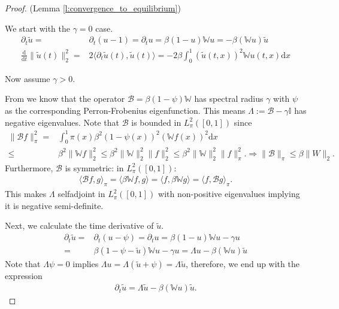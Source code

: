 \documentclass{article}
\renewcommand{\d}{\mathrm{d}}
\newcommand{\W}{\mathbb{W}}
\newcommand{\1}[1]{{\mathds{1}}_{\left\{#1\right\}}}
\begin{document}
\begin{proof}(Lemma \ref{l:convergence_to_equilibrium})
	
	We start with the $\gamma=0$ case.
	\begin{align*}
	\partial_t \tilde{u}=&\partial_t (u-1)=\partial_t u=\beta(1-u)\W u=-\beta \left(\W u \right) \tilde{u} \\
	\frac{\d}{\d t} \|\tilde{u}(t) \|_2^2=& 2 \langle \partial_t \tilde{u}(t), \tilde{u}(t) \rangle=-2\beta \int_{0}^{1}  \left( \tilde{u}(t,x) \right)^2 \W u(t,x) \d x 
	\end{align*}
	
	Now assume $\gamma>0$.
	
	From \cite[Proposition 4.13.]{SISdyn} we know that the operator $\mathcal{B}=\beta(1-\psi)\W$ has spectral radius $\gamma$ with $\psi$ as the corresponding Perron-Frobenius eigenfunction. This means $\Lambda:=\mathcal{B}-\gamma \mathbb{I}$ has negative eigenvalues. Note that $\mathcal{B}$ is bounded in $L^2_{\pi}([0,1])$ since
	\begin{align*}
		\|\mathcal{B}f \|_{\pi}^2=&\int_{0}^{1} \pi(x) \beta^2 (1-\psi(x))^2 \left(\W f(x) \right)^2 \d x  \\
		\leq& \beta^2 \|\W f \|_2^2 \leq \beta^2 \|\W \|_2^2 \|f \|_2^2 \leq \beta^2 \|\W \|_2^2 \|f \|_\pi^2. \Rightarrow \|\mathcal{B} \|_\pi \leq \beta \|W \|_2.
	\end{align*}
	Furthermore, $\mathcal{B}$ is symmetric: in $L^2_{\pi}([0,1])$:
	\begin{align*}
	\langle \mathcal{B}f, g \rangle_{\pi}= \langle \beta \W f, g \rangle=	\langle  f, \beta \W g \rangle=\langle f, \mathcal{B}g \rangle_{\pi}.
	\end{align*}
	This makes $\Lambda$ selfadjoint in $L^2_\pi([0,1])$ with non-positive eigenvalues implying it is negative semi-definite.
	
	Next, we calculate the time derivative of $\tilde{u}.$
	\begin{align*}
		\partial_t \tilde{u}=&\partial_t (u-\psi)=\partial_t u=\beta(1-u)\W u-\gamma u\\
		=& \beta(1-\psi-\tilde{u})\W u-\gamma u=\Lambda u-\beta \left( \W u \right)\tilde{u}
	\end{align*}	
	Note that $\Lambda \psi=0$ implies $\Lambda u= \Lambda (\tilde{u}+\psi)=\Lambda \tilde{u}$, therefore, we end up with the expression
	\begin{align*}
		\partial_t \tilde{u}=\Lambda \tilde{u}-\beta \left( \W u \right) \tilde{u}.
	\end{align*}
	

\end{proof}
\end{document}
